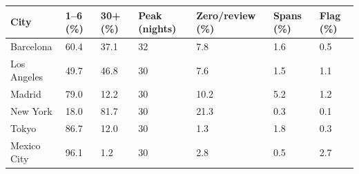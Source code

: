 \begin{tabular}{lllllll}
\toprule
City & 1--6 (\%) & 30+ (\%) & Peak (nights) & Zero/review (\%) & Spans (\%) & Flag (\%) \\
\midrule
Barcelona & 60.4 & 37.1 & 32 & 7.8 & 1.6 & 0.5 \\
Los Angeles & 49.7 & 46.8 & 30 & 7.6 & 1.5 & 1.1 \\
Madrid & 79.0 & 12.2 & 30 & 10.2 & 5.2 & 1.2 \\
New York & 18.0 & 81.7 & 30 & 21.3 & 0.3 & 0.1 \\
Tokyo & 86.7 & 12.0 & 30 & 1.3 & 1.8 & 0.3 \\
Mexico City & 96.1 & 1.2 & 30 & 2.8 & 0.5 & 2.7 \\
\bottomrule
\end{tabular}
